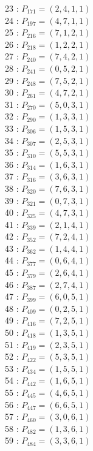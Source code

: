 \documentclass{article}
\begin{document}
{\begin{multicols}{3}
23 : $P_{171}=( 2, 4, 1, 1 )$\\
24 : $P_{197}=( 4, 7, 1, 1 )$\\
25 : $P_{216}=( 7, 1, 2, 1 )$\\
26 : $P_{218}=( 1, 2, 2, 1 )$\\
27 : $P_{240}=( 7, 4, 2, 1 )$\\
28 : $P_{241}=( 0, 5, 2, 1 )$\\
29 : $P_{248}=( 7, 5, 2, 1 )$\\
30 : $P_{261}=( 4, 7, 2, 1 )$\\
31 : $P_{270}=( 5, 0, 3, 1 )$\\
32 : $P_{290}=( 1, 3, 3, 1 )$\\
33 : $P_{306}=( 1, 5, 3, 1 )$\\
34 : $P_{307}=( 2, 5, 3, 1 )$\\
35 : $P_{310}=( 5, 5, 3, 1 )$\\
36 : $P_{314}=( 1, 6, 3, 1 )$\\
37 : $P_{316}=( 3, 6, 3, 1 )$\\
38 : $P_{320}=( 7, 6, 3, 1 )$\\
39 : $P_{321}=( 0, 7, 3, 1 )$\\
40 : $P_{325}=( 4, 7, 3, 1 )$\\
41 : $P_{339}=( 2, 1, 4, 1 )$\\
42 : $P_{352}=( 7, 2, 4, 1 )$\\
43 : $P_{362}=( 1, 4, 4, 1 )$\\
44 : $P_{377}=( 0, 6, 4, 1 )$\\
45 : $P_{379}=( 2, 6, 4, 1 )$\\
46 : $P_{387}=( 2, 7, 4, 1 )$\\
47 : $P_{399}=( 6, 0, 5, 1 )$\\
48 : $P_{409}=( 0, 2, 5, 1 )$\\
49 : $P_{416}=( 7, 2, 5, 1 )$\\
50 : $P_{418}=( 1, 3, 5, 1 )$\\
51 : $P_{419}=( 2, 3, 5, 1 )$\\
52 : $P_{422}=( 5, 3, 5, 1 )$\\
53 : $P_{434}=( 1, 5, 5, 1 )$\\
54 : $P_{442}=( 1, 6, 5, 1 )$\\
55 : $P_{445}=( 4, 6, 5, 1 )$\\
56 : $P_{447}=( 6, 6, 5, 1 )$\\
57 : $P_{460}=( 3, 0, 6, 1 )$\\
58 : $P_{482}=( 1, 3, 6, 1 )$\\
59 : $P_{484}=( 3, 3, 6, 1 )$\\

\end{multicols}}
\end{document}
